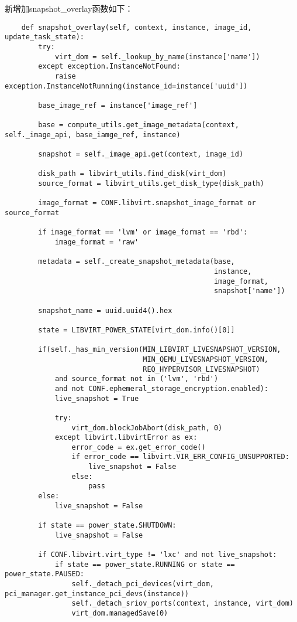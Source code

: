 \documentclass[a4paper,left=1.5cm,right=1.5cm,11pt]{article}
\begin{document}
    新增加snapshot\_overlay函数如下：
    \begin{lstlisting}
    def snapshot_overlay(self, context, instance, image_id, update_task_state):
        try:
            virt_dom = self._lookup_by_name(instance['name'])
        except exception.InstanceNotFound:
            raise exception.InstanceNotRunning(instance_id=instance['uuid'])

        base_image_ref = instance['image_ref']

        base = compute_utils.get_image_metadata(context, self._image_api, base_iamge_ref, instance)
        
        snapshot = self._image_api.get(context, image_id)

        disk_path = libvirt_utils.find_disk(virt_dom)
        source_format = libvirt_utils.get_disk_type(disk_path)

        image_format = CONF.libvirt.snapshot_image_format or source_format

        if image_format == 'lvm' or image_format == 'rbd':
            image_format = 'raw'

        metadata = self._create_snapshot_metadata(base,
                                                  instance,
                                                  image_format,
                                                  snapshot['name'])

        snapshot_name = uuid.uuid4().hex

        state = LIBVIRT_POWER_STATE[virt_dom.info()[0]]

        if(self._has_min_version(MIN_LIBVIRT_LIVESNAPSHOT_VERSION,
                                 MIN_QEMU_LIVESNAPSHOT_VERSION,
                                 REQ_HYPERVISOR_LIVESNAPSHOT)
            and source_format not in ('lvm', 'rbd')
            and not CONF.ephemeral_storage_encryption.enabled):
            live_snapshot = True

            try:
                virt_dom.blockJobAbort(disk_path, 0)
            except libvirt.libvirtError as ex:
                error_code = ex.get_error_code()
                if error_code == libvirt.VIR_ERR_CONFIG_UNSUPPORTED:
                    live_snapshot = False
                else:
                    pass
        else:
            live_snapshot = False

        if state == power_state.SHUTDOWN:
            live_snapshot = False

        if CONF.libvirt.virt_type != 'lxc' and not live_snapshot:
            if state == power_state.RUNNING or state == power_state.PAUSED:
                self._detach_pci_devices(virt_dom, pci_manager.get_instance_pci_devs(instance))
                self._detach_sriov_ports(context, instance, virt_dom)
                virt_dom.managedSave(0)


\end{lstlisting}
\end{document}
